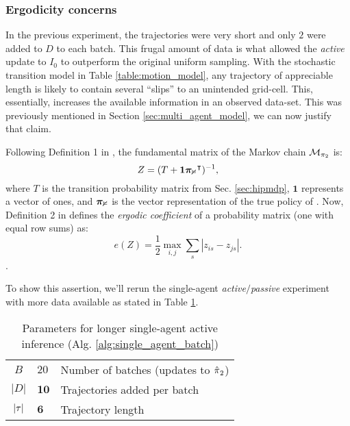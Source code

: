 \subsubsection{Ergodicity concerns}

In the previous experiment, the trajectories were very short and only $2$ were added to $D$ to each batch. This frugal amount of data is what allowed the \emph{active} update to $I_0$ to outperform the original uniform sampling. With the stochastic transition model in Table \ref{table:motion_model}, any trajectory of appreciable length is likely to contain several ``slips'' to an unintended grid-cell. This, essentially, increases the available information in an observed data-set. This was previously mentioned in Section \ref{sec:multi_agent_model}, we can now justify that claim.

Following Definition 1 in \cite{Hanawal2017LearningPolicies}, the fundamental matrix of the Markov chain $\mathcal{M}_{\pi_{2}}$ is:
\[
Z = (T + \mathbf{1}\boldsymbol{\mathbb{\pi_{2}}}^{\intercal})^{-1},
\]
where $T$ is the transition probability matrix from Sec. \ref{sec:hipmdp}, $\mathbf{1}$ represents a vector of ones, and $\boldsymbol{\mathbb{\pi_{2}}}$ is the vector representation of the true policy of . Now, Definition 2 in \cite{Hanawal2017LearningPolicies} defines the \emph{ergodic coefficient} of a probability matrix (one with equal row sums) as:
\[
e(Z) = \frac{1}{2}\max_{i,j} \sum_s |z_{is} - z_{js}|.
\]
\cite{Hanawal2017LearningPolicies}. 


To show this assertion, we'll rerun the single-agent \emph{active}$/$\emph{passive} experiment with more data available as stated in Table \ref{table:single_agent_active_alg_params_long}.

    \begin{table}[htb]
	\centering
	\begin{tabular}{c|l l}
		$B$ & $20$ & Number of batches (updates to $\hat{\pi_{}}_2$)\\
		$|D|$ & $\mathbf{10}$ & Trajectories added per batch \\
		$|\tau|$ & $\mathbf{6}$ & Trajectory length \\
	\end{tabular}
	\caption{Parameters for longer single-agent active inference (Alg. \ref{alg:single_agent_batch})}
	\label{table:single_agent_active_alg_params_long}
\end{table}


